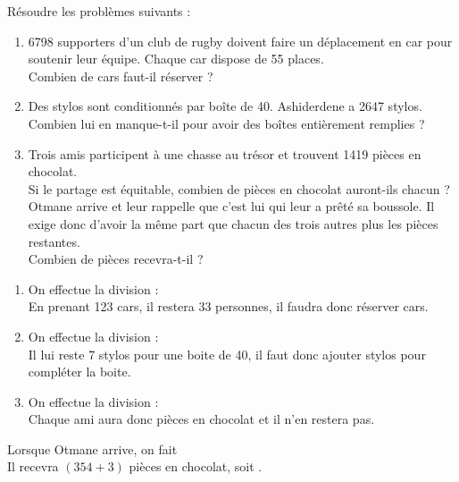 \begin{exercice*}
   Résoudre les problèmes suivants :
   \begin{enumerate}
      \item \num{6 798} supporters d'un club de rugby doivent faire un déplacement en car pour soutenir leur équipe. Chaque car dispose de 55 places. \\
        Combien de cars faut-il réserver ?
      \item Des stylos sont conditionnés par boîte de 40. Ashiderdene a \num{2 647} stylos. \\
         Combien lui en manque-t-il pour avoir des boîtes entièrement remplies ?
      \item Trois amis participent à une chasse au trésor et trouvent \num{1 419} pièces en chocolat. \\
      Si le partage est équitable, combien de pièces en chocolat auront-ils chacun ? \\
      Otmane arrive et leur rappelle que c'est lui qui leur a prêté sa boussole. Il exige donc d'avoir la même part que chacun des trois autres plus les pièces restantes. \\
      Combien de pièces recevra-t-il ?
   \end{enumerate}
\end{exercice*}

\begin{corrige}
   \begin{enumerate}
      \item On effectue la division : {\small {}} \\
         En prenant 123 cars, il restera 33 personnes, il faudra donc réserver { cars}.
      \item On effectue la division : {\small {}} \\
         Il lui reste 7 stylos pour une boite de 40, il faut donc ajouter { stylos} pour compléter la boite.
   \end{enumerate}
   \Coupe
   \begin{enumerate}
    \setcounter{enumi}{2}
      \item On effectue la division : {\small {}} \\
         Chaque ami aura donc { pièces en chocolat} et il n'en restera	pas.
   \end{enumerate}
   Lorsque Otmane arrive, on fait {\small {}} \\
   Il recevra $(354+3)$ pièces en chocolat, soit {}. \\
\end{corrige}